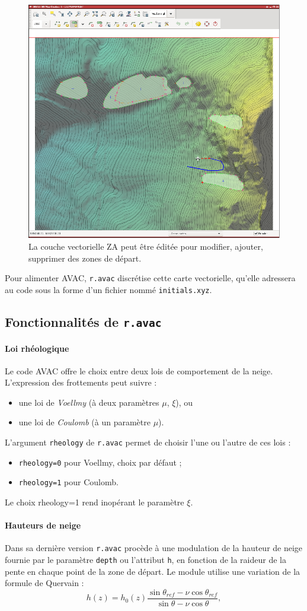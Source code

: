 \documentclass[12pt,oneside]{paper}
\newcommand{\bei}{\begin{itemize}}
\newcommand{\eit}{\end{itemize}}
\begin{document}
\begin{figure}[!h]
\begin{center}
\includegraphics[width=0.70\hsize]{capture2.eps}
\caption{La couche vectorielle ZA peut être éditée pour modifier, ajouter, supprimer des zones de départ.}
\label{fig:vector}
\end{center}
\end{figure}

Pour alimenter AVAC, \verb+r.avac+ discrétise cette carte vectorielle, qu'elle adressera au code sous la forme d'un fichier nommé \texttt{initials.xyz}.


\subsection{Fonctionnalités de \texttt{r.avac}}

\paragraph{Loi rhéologique}
Le code AVAC offre le choix entre deux lois de comportement de la neige. 
L'expression des frottements peut suivre :
\bei
\item une loi de \emph{Voellmy} (à deux paramètres $\mu$, $\xi$), ou
\item une loi de \emph{Coulomb} (à un paramètre $\mu$).
\eit
L'argument \texttt{rheology} de \verb+r.avac+ permet de choisir l'une ou l'autre de ces lois : 
\bei
\item \texttt{rheology=0} pour Voellmy, choix par défaut ;
\item \texttt{rheology=1} pour Coulomb.
\eit
Le choix rheology=1 rend inopérant le paramètre $\xi$.

\paragraph{Hauteurs de neige}
Dans sa dernière version \verb+r.avac+ procède à une modulation de la hauteur de neige fournie par le paramètre \texttt{depth} ou l'attribut \texttt{h}, en fonction de la raideur de la pente en chaque point de la zone de départ. Le module utilise une variation de la formule de Quervain :
\[
h(z) = h_0(z) \frac{\sin\theta_{ref}-\nu \cos\theta_{ref}}{\sin\theta -\nu \cos\theta},
\]
\end{document}
